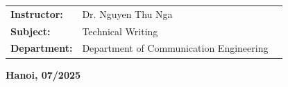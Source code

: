 \begin{titlepage}
\begin{center}
\begin{table}[H]
    \centering
    \begin{tabular}{l l c}
\textbf{\fontsize{13pt}{0pt}\selectfont Instructor:} & {\fontsize{13pt}{0pt}\selectfont Dr. Nguyen Thu Nga} \\%
\textbf{\fontsize{13pt}{0pt}\selectfont Subject:} & {\fontsize{13pt}{0pt}\selectfont Technical Writing}\\
\textbf{\fontsize{13pt}{0pt}\selectfont Department:} & {\fontsize{13pt}{0pt}\selectfont Department of Communication Engineering}
\end{tabular}
\end{table}
\vspace{3.5cm}
 \textbf{\fontsize{13pt}{0pt}\selectfont Hanoi, 07/2025
 }
\end{center}
\end{titlepage}


